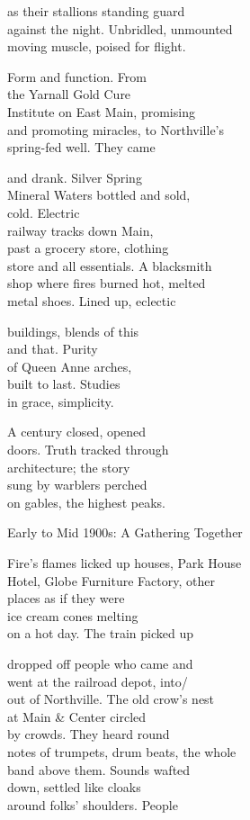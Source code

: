 \documentclass[twoside,10pt]{book}
\begin{document}
as their stallions standing guard\\
against the night. Unbridled, unmounted\\
moving muscle, poised for flight.

Form and function. From\\
the Yarnall Gold Cure\\
Institute on East Main, promising\\
and promoting miracles, to Northville's\\
spring-fed well. They came

and drank. Silver Spring\\
Mineral Waters bottled and sold,\\
cold. Electric\\
railway tracks down Main,\\
past a grocery store, clothing\\
store and all essentials. A blacksmith\\
shop where fires burned hot, melted\\
metal shoes. Lined up, eclectic

buildings, blends of this\\
and that. Purity\\
of Queen Anne arches,\\
built to last. Studies\\
in grace, simplicity.

A century closed, opened\\
doors. Truth tracked through\\
architecture; the story\\
sung by warblers perched\\
on gables, the highest peaks.

Early to Mid 1900s: A Gathering Together

Fire's flames licked up houses, Park House\\
Hotel, Globe Furniture Factory, other\\
places as if they were\\
ice cream cones melting\\
on a hot day. The train picked up

dropped off people who came and\\
went at the railroad depot, into/\\
out of Northville. The old crow's nest\\
at Main \& Center circled\\
by crowds. They heard round\\
notes of trumpets, drum beats, the whole\\
band above them. Sounds wafted\\
down, settled like cloaks\\
around folks' shoulders. People
\end{document}
